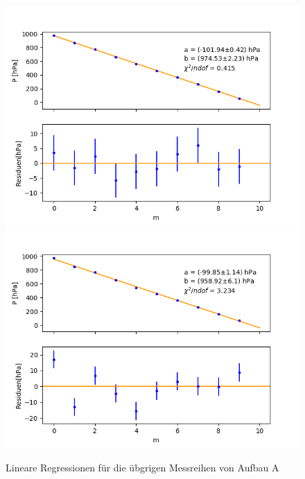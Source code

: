 \documentclass[12pt,a4paper]{article}
\begin{document}
\begin{figure}
\includegraphics[scale=0.5]{Bilder/Druck_A_Var2_5.png}
\includegraphics[scale=0.5]{Bilder/Druck_A_Var2_6.png}
\caption{Lineare Regressionen für die übgrigen Messreihen von Aufbau A}
\end{figure}
\end{document}
